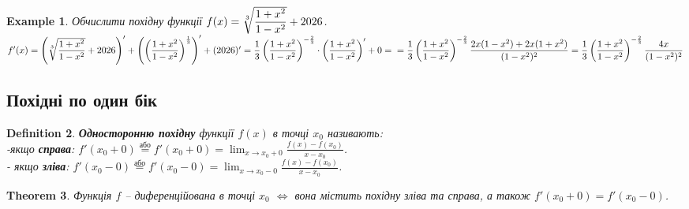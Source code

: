 \documentclass[a4paper, 14pt]{article}
\theoremstyle{theoremdd}
\newtheorem{theorem}{Theorem}[subsection]
\theoremstyle{theoremdd}
\newtheorem{definition}[theorem]{Definition}
\theoremstyle{theoremdd}
\theoremstyle{theoremdd}
\newtheorem{example}[theorem]{Example}
\theoremstyle{theoremdd}
\theoremstyle{theoremdd}
\theoremstyle{theoremdd}
\theoremstyle{theoremdd}
\begin{document}

\begin{example} Обчислити похідну функції $f(x) = \sqrt[3]{\dfrac{1+x^2}{1-x^2}} + \the\year$.\\
$f'(x) = \left( \sqrt[3]{\dfrac{1+x^2}{1-x^2}} + \the\year \right)' + \left(\left( \dfrac{1+x^2}{1-x^2} \right)^{\frac{1}{3}} \right)' + (\the\year)' = \dfrac{1}{3} \left( \dfrac{1+x^2}{1-x^2} \right)^{-\frac{2}{3}} \cdot \left( \dfrac{1+x^2}{1-x^2} \right)' + 0 = \\ = \dfrac{1}{3} \left( \dfrac{1+x^2}{1-x^2} \right)^{-\frac{2}{3}} \dfrac{2x(1-x^2)+2x(1+x^2)}{(1-x^2)^2} = \dfrac{1}{3} \left( \dfrac{1+x^2}{1-x^2} \right)^{-\frac{2}{3}} \dfrac{4x}{(1-x^2)^2}$
\end{example}

\subsection{Похідні по один бік}
\begin{definition}
\textbf{Односторонню похідну} функції $f(x)$ в точці $x_0$ називають:\\
-якщо \textbf{справа}: $\displaystyle f'(x_0+0) \overset{\text{або}}{=} f'(x_0+0) = \lim_{x \to x_0+0} \frac{f(x)-f(x_0)}{x-x_0}$.\\
- якщо \textbf{зліва}: $\displaystyle f'(x_0-0) \overset{\text{або}}{=} f'(x_0-0) = \lim_{x \to x_0-0} \frac{f(x)-f(x_0)}{x-x_0}$.
\end{definition}

\begin{theorem}
Функція $f$ -- диференційована в точці $x_0$ $\iff$ вона містить похідну зліва та справа, а також $f'(x_0+0) = f'(x_0-0)$.
\end{theorem}
\end{document}
